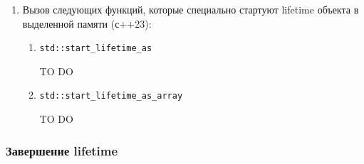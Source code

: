 \documentclass{article}
\begin{document}
\begin{enumerate}
\begin{enumerate}
\item \verb"std::bit_cast".
Данная операция создает новый объект из битового представления старого объекта.
\begin{cppcode}[numbers = none]
double x = 1.69;
uint64_t y = std::bit_cast<uint64_t>(x); // creates uint64_t from
                                         // the bit representation of double
\end{cppcode}
\end{enumerate}

\item Вызов следующих функций, которые специально стартуют lifetime объекта в выделенной памяти (с++23):
\begin{enumerate}
\item \verb"std::start_lifetime_as"
\begin{cppcode}[numbers = none]
TO DO
\end{cppcode}

\item \verb"std::start_lifetime_as_array"
\begin{cppcode}[numbers = none]
TO DO
\end{cppcode}
\end{enumerate}
\end{enumerate}


\subsubsection{Завершение lifetime}
\end{document}

